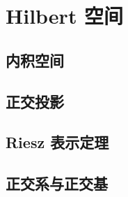 \section{Hilbert 空间}
\label{b1:sec:0804}


\subsection{内积空间}
\label{b1:subsec:080401}

\subsection{正交投影}
\label{b1:subsec:080402}

\subsection{Riesz 表示定理}
\label{b1:subsec:080403}

\subsection{正交系与正交基}
\label{b1:subsec:080404}


